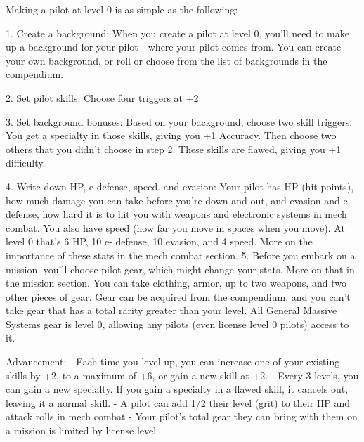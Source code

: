 Making a pilot at level 0 is as simple as the following:
 

     1.  Create a background: When you create a pilot at level 0, you’ll need to make up a  
         background for your pilot - where your pilot comes from. You can create your own  
         background, or roll or choose from the list of backgrounds in the compendium.
 
    2.   Set pilot skills: Choose four triggers at +2
 
    3.   Set background bonuses: Based on your background, choose two skill triggers. You get  
         a specialty in those skills, giving you +1 Accuracy. Then choose two others that you didn’t  
         choose in step 2. These skills are flawed, giving you +1 difficulty.
 
    4.   Write down HP, e-defense, speed. and evasion: Your pilot has HP (hit points), how much  
         damage you can take before you’re down and out, and evasion and e-defense, how  
         hard it is to hit you with weapons and electronic systems in mech combat. You also have  
         speed (how far you move in spaces when you move). At level 0 that’s 6 HP, 10 e- 
         defense, 10 evasion, and 4 speed. More on the importance of these stats in the mech  
         combat section.  
    5.   Before you embark on a mission, you’ll choose pilot gear, which might change your  
         stats. More on that in the mission section. You can take clothing, armor, up to two  
         weapons, and two other pieces of gear. Gear can be acquired from the compendium, and  
         you can’t take gear that has a total rarity greater than your level. All General Massive  
         Systems gear is level 0, allowing any pilots (even license level 0 pilots) access to it.
 

Advancement:  
          - Each time you level up, you can increase one of your existing skills by +2, to a maximum  
         of +6, or gain a new skill at +2.  
          - Every 3 levels, you can gain a new specialty. If you gain a specialty in a flawed skill, it  
         cancels out, leaving it a normal skill.  
         - A pilot can add 1/2 their level (grit) to their HP and attack rolls in mech combat  
         - Your pilot’s total gear they can bring with them on a mission is limited by license level  

                                                                                                                  


                                                                                            
 